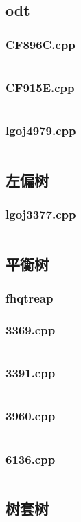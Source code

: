 \documentclass[a4paper,landscape,twocolumn]{article} %
\begin{document}
\subsection{odt}
\subsubsection{CF896C.cpp}
\inputminted{c++}{./codes/036}
\subsubsection{CF915E.cpp}
\inputminted{c++}{./codes/037}
\subsubsection{lgoj4979.cpp}
\inputminted{c++}{./codes/038}
\subsection{左偏树}
\subsubsection{lgoj3377.cpp}
\inputminted{c++}{./codes/039}
\subsection{平衡树}
\subsubsection{fhqtreap}
\subsubsection{3369.cpp}
\inputminted{c++}{./codes/040}
\subsubsection{3391.cpp}
\inputminted{c++}{./codes/041}
\subsubsection{3960.cpp}
\inputminted{c++}{./codes/042}
\subsubsection{6136.cpp}
\inputminted{c++}{./codes/043}
\subsection{树套树}
\end{document}

